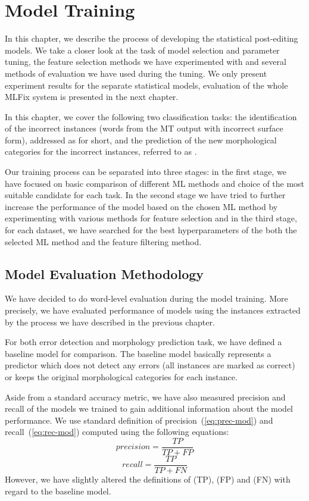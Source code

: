 \chapter{Model Training}
\label{chap:tuning}

In this chapter, we describe the process of developing
the statistical post-editing models. We take a closer look at the task of model
selection and parameter tuning, the feature selection methods we have experimented
with and several methods of evaluation we have used during the tuning.
We only present experiment results for the separate statistical models,
evaluation of the whole MLFix system is presented in the next chapter.

In this chapter, we cover the following two classification tasks: the identification
of the incorrect instances (words from the MT output with incorrect surface form),
addressed as  for short,
and the prediction of the new morphological categories for the incorrect instances,
referred to as .

Our training process can be separated into three stages: in the first stage, we
have focused on basic comparison of different ML methods and choice of the most
suitable candidate for each task.
In the second stage we have tried to further increase the performance of the model
based on the chosen ML method by experimenting with various methods for feature selection
and in the third stage, for each dataset, we have searched for the best hyperparameters
of the both the selected ML method and the feature filtering method.

\section{Model Evaluation Methodology}

We have decided to do word-level evaluation during the model training. More precisely,
we have evaluated performance of models using the instances extracted by the
process we have described in the previous chapter.

For both error detection and morphology prediction task, we have defined
a baseline model for comparison. The baseline model basically represents a predictor which
does not detect any errors (all instances are marked as correct) or keeps the original
morphological categories for each instance.

Aside from a standard accuracy metric, we have also measured
precision and recall
of the models we trained to gain additional information about the model performance.
We use standard definition of precision~(\ref{eq:prec-mod}) and recall~(\ref{eq:rec-mod}) computed using the following equations:
\begin{equation} \label{eq:prec-mod}
precision = \frac{TP}{TP + FP}
\end{equation}
\begin{equation} \label{eq:rec-mod}
recall = \frac{TP}{TP + FN}
\end{equation}
However, we have slightly altered the definitions of  (TP),
 (FP) and  (FN)
with regard to the baseline model.


